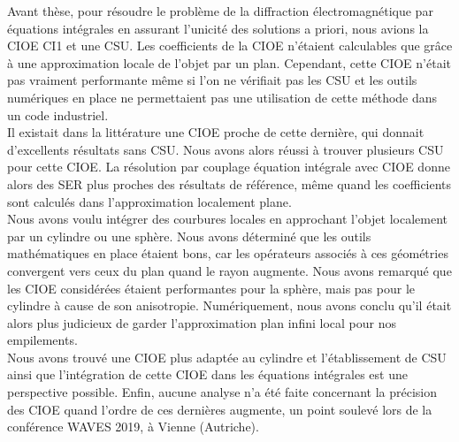 
Avant thèse, pour résoudre le problème de la diffraction électromagnétique par équations intégrales en assurant l'unicité des solutions a priori, nous avions la CIOE CI1 et une CSU.
Les coefficients de la CIOE n'étaient calculables que grâce à une approximation locale de l'objet par un plan.
Cependant, cette CIOE n'était pas vraiment performante même si l’on ne vérifiait pas les CSU et les outils numériques en place ne permettaient pas une utilisation de cette méthode dans un code industriel.
\\

Il existait dans la littérature une CIOE proche de cette dernière, qui donnait d'excellents résultats sans CSU.
Nous avons alors réussi à trouver plusieurs CSU pour cette CIOE.
La résolution par couplage équation intégrale avec CIOE donne alors des SER plus proches des résultats de référence, même quand les coefficients sont calculés dans l'approximation localement plane.
\\

Nous avons voulu intégrer des courbures locales en approchant l'objet localement par un cylindre ou une sphère.
Nous avons déterminé que les outils mathématiques en place étaient bons, car les opérateurs associés à ces géométries convergent vers ceux du plan quand le rayon augmente.
Nous avons remarqué que les CIOE considérées étaient performantes pour la sphère, mais pas pour le cylindre à cause de son anisotropie.
Numériquement, nous avons conclu qu'il était alors plus judicieux de garder l’approximation plan infini local pour nos empilements.
\\

Nous avons trouvé une CIOE plus adaptée au cylindre et l'établissement de CSU ainsi que l'intégration de cette CIOE dans les équations intégrales est une perspective possible.
Enfin, aucune analyse n'a été faite concernant la précision des CIOE quand l'ordre de ces dernières augmente, un point soulevé lors de la conférence WAVES 2019, à Vienne (Autriche).
